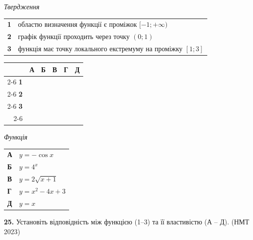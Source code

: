 \documentclass[14pt]{extarticle}
\newcommand{\answerGrid}{
    \begingroup
    \renewcommand{\arraystretch}{1.3} 
    \setlength{\tabcolsep}{7pt} 
    \begin{tabular}{r|c|c|c|c|c|}
         \multicolumn{1}{c}{} & \multicolumn{1}{c}{\textbf{А}} & \multicolumn{1}{c}{\textbf{Б}} & \multicolumn{1}{c}{\textbf{В}} & \multicolumn{1}{c}{\textbf{Г}} & \multicolumn{1}{c}{\textbf{Д}} \\ \cline{2-6}
         \textbf{1} & & & & & \\ \cline{2-6}
         \textbf{2} & & & & & \\ \cline{2-6}
         \textbf{3} & & & & & \\ \cline{2-6}
    \end{tabular}
    \endgroup
}
\newcommand{\nmtyear}[1]{\hfill{\small\color{yearcolor}(НМТ #1)}}
\begin{document}
\noindent
\begin{minipage}[t]{0.50\textwidth}
    \textit{Твердження} \par \vspace{0.2cm}
    \begin{tabular}{@{}p{0.5cm} p{7cm}@{}}
    \textbf{1} & областю визначення функції є проміжок $[-1; +\infty)$ \\
    \textbf{2} & графік функції проходить через точку $(0; 1)$ \\
    \textbf{3} & функція має точку локального екстремуму на проміжку $[1; 3]$ \\
    \end{tabular}
    
    \vspace{0.3cm}
    \answerGrid
\end{minipage}%
\hfill
\begin{minipage}[t]{0.45\textwidth}
    \textit{Функція} \par \vspace{0.2cm}
    \begin{tabular}{ll}
    \textbf{А} & $y=-\cos x$ \\[0.3cm]
    \textbf{Б} & $y=4^x$ \\[0.3cm]
    \textbf{В} & $y=2\sqrt{x+1}$ \\[0.3cm]
    \textbf{Г} & $y=x^2-4x+3$ \\[0.3cm]
    \textbf{Д} & $y=x$ \\
    \end{tabular}
\end{minipage}

\vspace{0.7cm}

\noindent\textbf{25.} Установіть відповідність між функцією (1–3) та її властивістю (А – Д). \nmtyear{2023}

\vspace{0.3cm}
\end{document}
